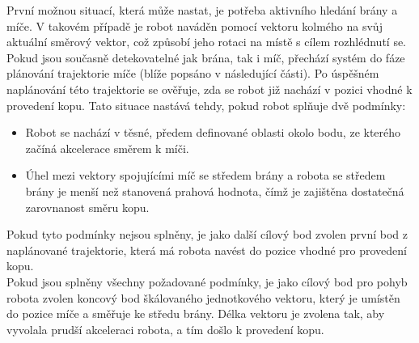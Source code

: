 \documentclass[a4paper,12pt]{article}
\begin{document}
První možnou situací, která může nastat, je potřeba aktivního hledání brány a míče. V takovém případě je robot naváděn pomocí vektoru kolmého na svůj aktuální směrový vektor, což způsobí jeho rotaci na místě s cílem rozhlédnutí se.\\

Pokud jsou současně detekovatelné jak brána, tak i míč, přechází systém do fáze plánování trajektorie míče (blíže popsáno v následující části). Po úspěšném naplánování této trajektorie se ověřuje, zda se robot již nachází v pozici vhodné k provedení kopu. Tato situace nastává tehdy, pokud robot splňuje dvě podmínky:
\begin{itemize}
	\item 
	Robot se nachází v těsné, předem definované oblasti okolo bodu, ze kterého začíná akcelerace směrem k míči.
	\item
	Úhel mezi vektory spojujícími míč se středem brány a robota se středem brány je menší než stanovená prahová hodnota, čímž je zajištěna dostatečná zarovnanost směru kopu.
\end{itemize}
Pokud tyto podmínky nejsou splněny, je jako další cílový bod zvolen první bod z naplánované trajektorie, která má robota navést do pozice vhodné pro provedení kopu.\\
Pokud jsou splněny všechny požadované podmínky, je jako cílový bod pro pohyb robota zvolen koncový bod škálovaného jednotkového vektoru, který je umístěn do pozice míče a směřuje ke středu brány. Délka vektoru je zvolena tak, aby vyvolala prudší akceleraci robota, a tím došlo k provedení kopu. 
\end{document}

